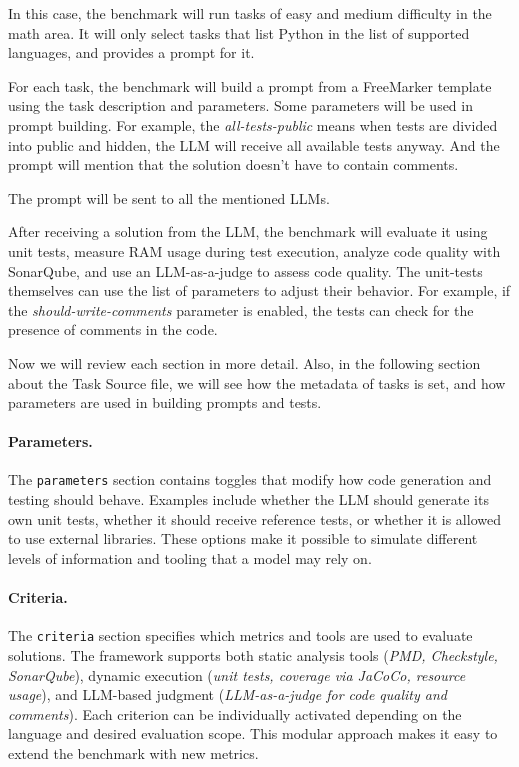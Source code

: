 In this case, the benchmark will run tasks of easy and medium difficulty in the math area.
It will only select tasks that list Python in the list of supported languages, and provides a prompt for it.

For each task, the benchmark will build a prompt from a FreeMarker template using the task description and parameters.
Some parameters will be used in prompt building.
For example, the \textit{all-tests-public} means when tests are divided into public and hidden, the LLM will receive all available tests anyway.
And the prompt will mention that the solution doesn't have to contain comments.

The prompt will be sent to all the mentioned LLMs.

After receiving a solution from the LLM, the benchmark will evaluate it using unit tests, measure RAM usage during test execution, analyze code quality with SonarQube, and use an LLM-as-a-judge to assess code quality.
The unit-tests themselves can use the list of parameters to adjust their behavior.
For example, if the \textit{should-write-comments} parameter is enabled, the tests can check for the presence of comments in the code.

Now we will review each section in more detail.
Also, in the following section about the Task Source file, we will see how the metadata of tasks is set, and how parameters are used in building prompts and tests.

\paragraph{Parameters.}
The \texttt{parameters} section contains toggles that modify how code generation and testing should behave.
Examples include whether the LLM should generate its own unit tests, whether it should receive reference tests, or whether it is allowed to use external libraries.
These options make it possible to simulate different levels of information and tooling that a model may rely on.

\paragraph{Criteria.}
The \texttt{criteria} section specifies which metrics and tools are used to evaluate solutions.
The framework supports both static analysis tools (\emph{PMD, Checkstyle, SonarQube}), dynamic execution (\emph{unit tests, coverage via JaCoCo, resource usage}), and LLM-based judgment (\emph{LLM-as-a-judge for code quality and comments}).
Each criterion can be individually activated depending on the language and desired evaluation scope.
This modular approach makes it easy to extend the benchmark with new metrics.

